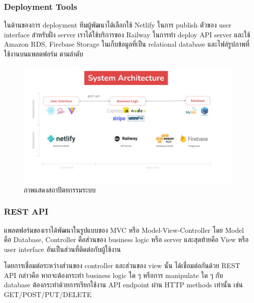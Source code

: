 \subsubsection{Deployment Tools}
ในด้านของการ deployment ทีมผู้พัฒนาได้เลือกใช้ Netlify ในการ publish ตัวของ user interface สำหรับฝั่ง server เราได้ใช้บริการของ Railway ในการทำ deploy API server และใช้ Amazon RDS, Firebase Storage ในเก็บข้อมูลที่เป็น relational database และไฟล์รูปภาพที่ใช้งานบนแพลตฟอร์ม ตามลำดับ
\begin{figure}[!ht]
    \begin{center}
    \includegraphics[width=\linewidth]{./image/System_Architecture.png}
    \end{center}
    \caption[System Architecture]{ภาพแสดงสถาปัตยกรรมระบบ}
    \label{fig:System_Architecture}
\end{figure}

\subsubsection{REST API}
แพลตฟอร์มของเราได้พัฒนาในรูปแบบของ MVC หรือ Model-View-Controller โดย Model คือ Database, Controller คือส่วนของ business logic หรือ server และสุดท้ายคือ View หรือ user interface อันเป็นส่วนที่ติดต่อกับผู้ใช้งาน

โดยการเชื่อมต่อระหว่างส่วนของ controller และส่วนของ view นั้น ได้เชื่อมต่อกันด้วย REST API กล่าวคือ หากจะต้องกระทำ business logic ใด ๆ หรือการ manipulate ใด ๆ กับ database ต้องกระทำด้วยการเรียกใช้งาน API endpoint ผ่าน HTTP methods เท่านั้น เช่น GET/POST/PUT/DELETE

